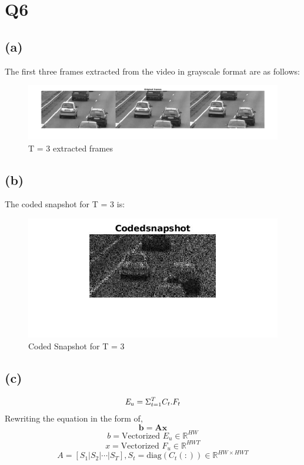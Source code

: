 \documentclass{article}
\begin{document}
\section{Q6}
\subsection{(a)}
The first three frames extracted from the video in grayscale format are as follows:
\begin{figure}[ht]
\centering
\includegraphics[width=1\textwidth]{t3/all.jpg}
\caption{T = 3 extracted frames}
\end{figure}

\subsection{(b)}
The coded snapshot for T = 3 is:
\begin{figure}[!h]
\centering
\includegraphics[width=1\textwidth]{t3/codedsnapshot.jpg}
\caption{Coded Snapshot for T = 3}
\end{figure}

\newpage
\subsection{(c)}

\begin{equation}
    \emph E_u = \Sigma^T_{t=1} C_{t} . F_t
\end{equation}
Rewriting the equation in the form of,
$$ \mathbf{ b = A  x}$$
$$b = \text{Vectorized } E_u \in \mathbb{R}^{HW}$$
$$x = \text{Vectorized } F_u \in \mathbb{R}^{HWT}$$
$$A = [S_1|S_2|\cdots|S_T], S_t = \text{diag}(C_t(:)) \in \mathbb{R}^{HW \times HWT}$$
\end{document}
